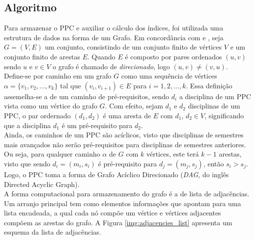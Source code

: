 \documentclass[a4paper, 12pt]{article}
\begin{document}
\subsection*{Algoritmo}

Para armazenar o PPC e auxiliar o cálculo dos índices, foi utilizada uma estrutura de dados na forma de um Grafo. Em concordância com \cite{book_cormen} e \cite{book_sedgewick}, seja $G = (V, E)$ um conjunto, consistindo 
de um conjunto finito de vértices $V$ e um conjunto finito de arestas $E$. Quando $E$ é composto por pares ordenados $(u, v)$ sendo $u$ e $v \in V$ o grafo é 
chamado de \textit{direcionado}, logo $(u, v) \neq (v, u)$. \\

Define-se por caminho em um grafo $G$ como uma sequência de vértices $\alpha = \{ v_1, v_2, \dots, v_k \}$ tal que $(v_i, v_{i+1}) \in E$ para $i = 1, 2, \dots, k$.
Essa definição assemelha-se a de um caminho de pré-requisitos, sendo $d_i$ a disciplina de um PPC vista como um vértice do grafo $G$. Com efeito, sejam $d_1$ e 
$d_2$ disciplinas de um PPC, o par ordernado $(d_1, d_2)$ é uma aresta de $E$ com $d_1$, $d_2 \in V$, significando que a disciplina $d_1$ é um pré-requisito 
para $d_2$. \\

Ainda, os caminhos de um PPC são acíclicos, visto que disciplinas de semestres mais avançados não serão pré-requisitos para disciplinas de semestres 
anteriores. Ou seja, para qualquer caminho $\alpha$ de $G$ com $k$ vértices, este terá $k-1$ arestas, visto que sendo $d_i=(m_i, s_i)$ é pré-requisito para 
$d_j=(m_j, s_j)$, então $s_i > s_j$. Logo, o PPC toma a forma de Grafo Acíclico Direcionado (\textit{DAG}, do inglês Directed Acyclic Graph). \\

A forma computacional para armazenamento do grafo é a de lista de adjacências. Um arranjo principal tem como elementos informações que apontam para uma 
lista encadeada, a qual cada nó compõe um vértice e vértices adjacentes compõem as arestas do grafo. A Figura \ref{img:adjacencies_list} apresenta um 
esquema da lista de adjacências. \\
\end{document}

